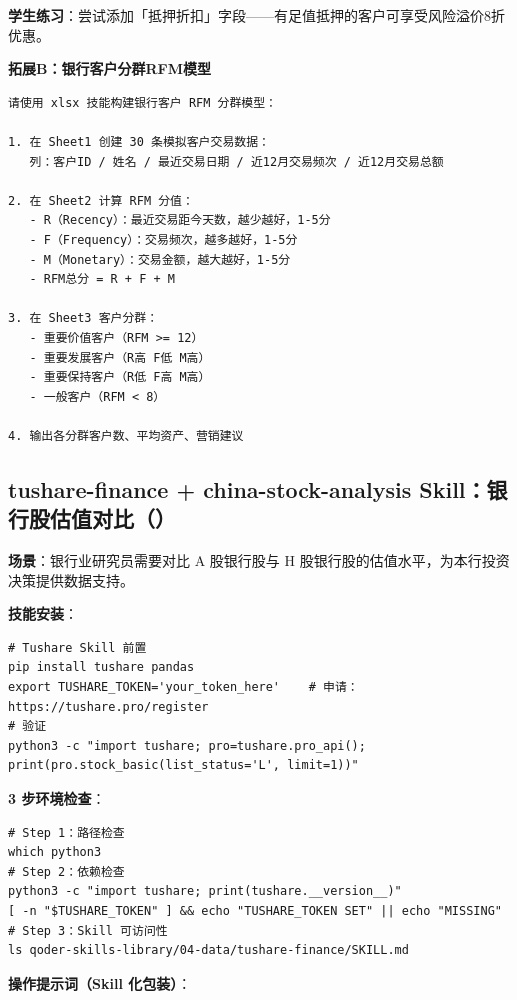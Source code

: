 \textbf{学生练习}：尝试添加「抵押折扣」字段——有足值抵押的客户可享受风险溢价8折优惠。

\textbf{拓展B：银行客户分群RFM模型}

\begin{lstlisting}
请使用 xlsx 技能构建银行客户 RFM 分群模型：

1. 在 Sheet1 创建 30 条模拟客户交易数据：
   列：客户ID / 姓名 / 最近交易日期 / 近12月交易频次 / 近12月交易总额

2. 在 Sheet2 计算 RFM 分值：
   - R（Recency）：最近交易距今天数，越少越好，1-5分
   - F（Frequency）：交易频次，越多越好，1-5分
   - M（Monetary）：交易金额，越大越好，1-5分
   - RFM总分 = R + F + M

3. 在 Sheet3 客户分群：
   - 重要价值客户（RFM >= 12）
   - 重要发展客户（R高 F低 M高）
   - 重要保持客户（R低 F高 M高）
   - 一般客户（RFM < 8）

4. 输出各分群客户数、平均资产、营销建议
\end{lstlisting}

\subsection{tushare-finance + china-stock-analysis Skill：银行股估值对比（）}

\textbf{场景}：银行业研究员需要对比 A 股银行股与 H 股银行股的估值水平，为本行投资决策提供数据支持。

\textbf{技能安装}：

\begin{lstlisting}[style=shell]
# Tushare Skill 前置
pip install tushare pandas
export TUSHARE_TOKEN='your_token_here'    # 申请：https://tushare.pro/register
# 验证
python3 -c "import tushare; pro=tushare.pro_api(); print(pro.stock_basic(list_status='L', limit=1))"
\end{lstlisting}

\textbf{3 步环境检查}：
\begin{lstlisting}[style=shell]
# Step 1：路径检查
which python3
# Step 2：依赖检查
python3 -c "import tushare; print(tushare.__version__)"
[ -n "$TUSHARE_TOKEN" ] && echo "TUSHARE_TOKEN SET" || echo "MISSING"
# Step 3：Skill 可访问性
ls qoder-skills-library/04-data/tushare-finance/SKILL.md
\end{lstlisting}

\textbf{操作提示词（Skill 化包装）}：

